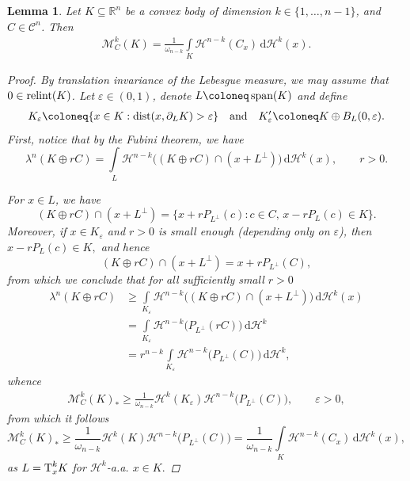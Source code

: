 \documentclass[pdflatex,sn-mathphys-num]{sn-jnl}
\theoremstyle{plain}
\newtheorem{lemma}[theorem]{Lemma}
\theoremstyle{definition}
\DeclareMathOperator{\LO}{\textup{span}}
\DeclareMathOperator{\relint}{\textup{relint}}
\DeclareMathOperator{\dist}{\textup{dist}}
\newcommand{\dH}[1]{\,\mathrm d\mathcal{H}^{#1}}
\begin{document}
\begin{lemma}\label{inter}
    Let $K\subseteq\mathbb{R}^n$ be a convex body of dimension $k\in\{1, \dots, n-1\}$, and $C\in\mathcal{C}^n$. Then
        \begin{align}\label{pp2}
            \mathcal{M}^k_{C}(K)=\frac{1}{\omega_{n-k}}\int\limits_{K}\mathcal{H}^{n-k}(C_x)\dH{k}(x).
        \end{align}
        \begin{proof}
            By translation invariance of the Lebesgue measure, we may assume that $0\in\relint(K)$. Let $\varepsilon\in (0, 1)$, denote $L\coloneq\LO(K)$ and define \begin{align*}
                K_{\varepsilon}\coloneq\{x\in K : \dist(x, \partial_L K)>\varepsilon\}&&\text{and}&& K^{\prime}_{\varepsilon}\coloneq K\oplus B_{L}(0, \varepsilon).
            \end{align*}
            First, notice that by the Fubini theorem, we have
            $$\lambda^n(K\oplus rC)=\int\limits_{L}\mathcal{H}^{n-k}\big((K\oplus rC)\cap (x+L^{\perp})\big)\dH{k}(x), \qquad r>0.$$ 

            For $x\in L$, we have $$(K\oplus rC)\cap (x+L^{\perp})=\big\{x+rP_{L^{\perp}}(c) : c\in C,\, x-rP_L(c)\in K\big\}.$$ Moreover, if $x\in K_{\varepsilon}$ and $r>0$ is small enough (depending only on $\varepsilon$), then $x-rP_L(c)\in K,$ and hence $$(K\oplus rC)\cap (x+L^{\perp})=x+rP_{L^{\perp}}(C),$$ from which we conclude that for all sufficiently small $r>0$\begin{equation*}
                \begin{split}
                    \lambda^n(K\oplus rC)&\geq\int\limits_{K_{\varepsilon}}\mathcal{H}^{n-k}\big((K\oplus rC)\cap (x+L^{\perp})\big)\dH{k}(x)\\&=\int\limits_{K_{\varepsilon}}\mathcal{H}^{n-k}\big(P_{L^{\perp}}(rC)\big)\dH{k}\\&=r^{n-k}\int\limits_{K_{\varepsilon}}\mathcal{H}^{n-k}\big(P_{L^{\perp}}(C)\big)\dH{k},
                \end{split}
            \end{equation*}whence \begin{equation*}
                \begin{split}
                    \mathcal{M}^k_C(K)_*\geq\frac{1}{\omega_{n-k}}\mathcal{H}^k(K_\varepsilon)\mathcal{H}^{n-k}\big(P_{L^{\perp}}(C)\big), \qquad\varepsilon>0,
                \end{split}
            \end{equation*}from which it follows $$\mathcal{M}^k_C(K)_*\geq\frac{1}{\omega_{n-k}}\mathcal{H}^k(K)\mathcal{H}^{n-k}\big(P_{L^{\perp}}(C)\big)=\frac{1}{\omega_{n-k}}\int\limits_{K}\mathcal{H}^{n-k}(C_x)\dH{k}(x),$$ as $L=\textup{T}^k_xK$ for $\mathcal{H}^k$-a.a. $x\in K.$



\end{proof}
\end{lemma}
\end{document}

